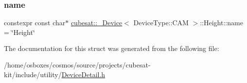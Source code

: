 \subsubsection{\texorpdfstring{name}{name}}
{\footnotesize\ttfamily constexpr const char$\ast$ \hyperlink{structcubesat_1_1__Device}{cubesat\+::\+\_\+\+Device}$<$ Device\+Type\+::\+C\+AM $>$\+::Height\+::name = \char`\"{}Height\char`\"{}\hspace{0.3cm}{\ttfamily [static]}}



The documentation for this struct was generated from the following file\+:\begin{DoxyCompactItemize}
\item 
/home/osboxes/cosmos/source/projects/cubesat-\/kit/include/utility/\hyperlink{DeviceDetail_8h}{Device\+Detail.\+h}\end{DoxyCompactItemize}
